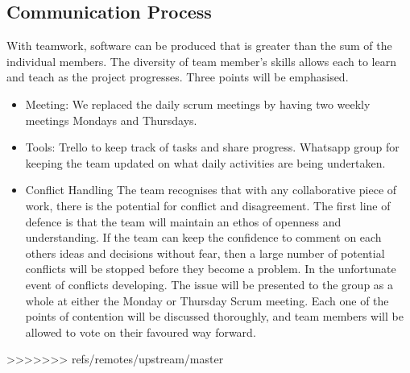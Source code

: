 \documentclass[11pt]{article}
\begin{document}
 \subsection{Communication Process}
With teamwork, software can be produced that is greater than the sum of the individual members. The diversity of team member's skills allows each to learn and teach as the project progresses. Three points will be emphasised.
  \begin{itemize}
  	\item Meeting: We replaced the daily scrum meetings by having two weekly meetings Mondays and Thursdays.
 	\item Tools: Trello to keep track of tasks and share progress. Whatsapp group for keeping the team updated on what daily activities are being undertaken.
  	\item Conflict Handling
 \subitem The team recognises that with any collaborative piece of work, there is the potential for conflict and disagreement. The first line of defence is that the team will maintain an ethos of openness and understanding. If the team can keep the confidence to comment on each others ideas and decisions without fear, then a large number of potential conflicts will be stopped before they become a problem.
 \subitem In the unfortunate event of conflicts developing. The issue will be presented to the group as a whole at either the Monday or Thursday Scrum meeting. Each one of the points of contention will be discussed thoroughly, and team members will be allowed to vote on their favoured way forward.
  \end{itemize}
>>>>>>> refs/remotes/upstream/master
\end{document}
